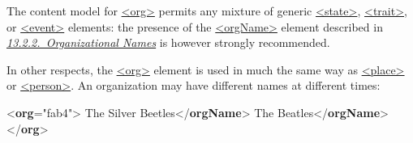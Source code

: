 The content model for \hyperref[TEI.org]{<org>} permits any mixture of generic \hyperref[TEI.state]{<state>}, \hyperref[TEI.trait]{<trait>}, or \hyperref[TEI.event]{<event>} elements: the presence of the \hyperref[TEI.orgName]{<orgName>} element described in \textit{\hyperref[NDORG]{13.2.2.\ Organizational Names}} is however strongly recommended.\par
In other respects, the \hyperref[TEI.org]{<org>} element is used in much the same way as \hyperref[TEI.place]{<place>} or \hyperref[TEI.person]{<person>}. An organization may have different names at different times: \par\bgroup{}\exampleFont \begin{shaded}\noindent\mbox{}{<\textbf{org}\hspace*{1em}{xml:id}="{fab4}">}\mbox{}\newline 
{}The Silver Beetles{</\textbf{orgName}>}\mbox{}\newline 
{}The Beatles{</\textbf{orgName}>}\mbox{}\newline 
{</\textbf{org}>}\end{shaded}\egroup\par \par
